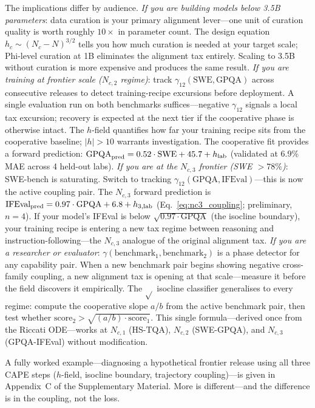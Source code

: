 \documentclass[11pt]{article}
\begin{document}
The implications differ by audience.
\textit{If you are building models below 3.5B parameters}: data curation is your primary alignment lever---one unit of curation quality is worth roughly $10\times$ in parameter count.
The design equation $h_c \sim (N_c - N)^{3/2}$ tells you how much curation is needed at your target scale; Phi-level curation at 1B eliminates the alignment tax entirely.
Scaling to 3.5B without curation is more expensive and produces the same result.
\textit{If you are training at frontier scale ($N_{c,2}$ regime)}: track $\gamma_{12}(\text{SWE}, \text{GPQA})$ across consecutive releases to detect training-recipe excursions before deployment.
A single evaluation run on both benchmarks suffices---negative $\gamma_{12}$ signals a local tax excursion; recovery is expected at the next tier if the cooperative phase is otherwise intact.
The $h$-field quantifies how far your training recipe sits from the cooperative baseline; $|h| > 10$ warrants investigation.
The cooperative fit provides a forward prediction: $\text{GPQA}_{\rm pred} = 0.52\cdot\text{SWE} + 45.7 + h_{\rm lab}$ (validated at 6.9\% MAE across 4 held-out labs).
\textit{If you are at the $N_{c,3}$ frontier (SWE $> 78\%$)}: SWE-bench is saturating.
Switch to tracking $\gamma_{12}(\text{GPQA}, \text{IFEval})$---this is now the active coupling pair.
The $N_{c,3}$ forward prediction is $\text{IFEval}_{\rm pred} = 0.97\cdot\text{GPQA} + 6.8 + h_{3,\rm lab}$ (Eq.~\ref{eq:nc3_coupling}; preliminary, $n=4$).
If your model's IFEval is below $\sqrt{0.97\cdot\text{GPQA}}$ (the isocline boundary), your training recipe is entering a new tax regime between reasoning and instruction-following---the $N_{c,3}$ analogue of the original alignment tax.
\textit{If you are a researcher or evaluator}: $\gamma(\text{benchmark}_1, \text{benchmark}_2)$ is a phase detector for any capability pair.
When a new benchmark pair begins showing negative cross-family coupling, a new alignment tax is opening at that scale---measure it before the field discovers it empirically.
The $\sqrt{}$ isocline classifier generalises to every regime: compute the cooperative slope $a/b$ from the active benchmark pair, then test whether $\text{score}_2 > \sqrt{(a/b)\cdot\text{score}_1}$.
This single formula---derived once from the Riccati ODE---works at $N_{c,1}$ (HS-TQA), $N_{c,2}$ (SWE-GPQA), and $N_{c,3}$ (GPQA-IFEval) without modification.

A fully worked example---diagnosing a hypothetical frontier release using all three CAPE steps ($h$-field, isocline boundary, trajectory coupling)---is given in Appendix~C of the Supplementary Material.
\bigskip
\noindent More is different---and the difference is in the coupling, not the loss.
\end{document}

